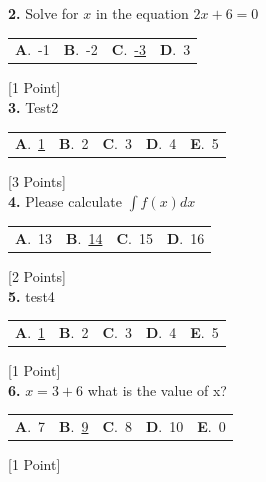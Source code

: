 \documentclass[12pt]{article}
\newcommand{\choice}[2]{\textbf{#1}.~#2}
\begin{document}
\noindent \textbf{\textenglish{2.}} {\textenglish{Solve for }}\(x \){\textenglish{ in the equation }}\(2x+6 = 0 \)

\begin{tabularx}{\linewidth}{@{}*{4}{Y}@{}}
\choice{A}{{{\textenglish{-1}}}} & \choice{B}{{{\textenglish{-2}}}} & \choice{C}{{\underline{{\textenglish{-3}}}}} & \choice{D}{{{\textenglish{3}}}} \\
\end{tabularx}
\hfill {\textenglish{[1 Point]}}\\[0.5em]

\noindent \textbf{\textenglish{3.}} {\textenglish{Test2}}

\begin{tabularx}{\linewidth}{@{}*{5}{Y}@{}}
\choice{A}{{\underline{{\textenglish{1}}}}} & \choice{B}{{{\textenglish{2}}}} & \choice{C}{{{\textenglish{3}}}} & \choice{D}{{{\textenglish{4}}}} & \choice{E}{{{\textenglish{5}}}} \\
\end{tabularx}
\hfill {\textenglish{[3 Points]}}\\[0.5em]

\noindent \textbf{\textenglish{4.}} {\textenglish{Please calculate }}\(\int f(x)dx\)

\begin{tabularx}{\linewidth}{@{}*{4}{Y}@{}}
\choice{A}{{{\textenglish{13}}}} & \choice{B}{{\underline{{\textenglish{14}}}}} & \choice{C}{{{\textenglish{15}}}} & \choice{D}{{{\textenglish{16}}}} \\
\end{tabularx}
\hfill {\textenglish{[2 Points]}}\\[0.5em]

\noindent \textbf{\textenglish{5.}} {\textenglish{test4}}

\begin{tabularx}{\linewidth}{@{}*{5}{Y}@{}}
\choice{A}{{\underline{{\textenglish{1}}}}} & \choice{B}{{{\textenglish{2}}}} & \choice{C}{{{\textenglish{3}}}} & \choice{D}{{{\textenglish{4}}}} & \choice{E}{{{\textenglish{5}}}} \\
\end{tabularx}
\hfill {\textenglish{[1 Point]}}\\[0.5em]

\noindent \textbf{\textenglish{6.}} \(x=3+6 \){\textenglish{ what is the value of x?}}

\begin{tabularx}{\linewidth}{@{}*{5}{Y}@{}}
\choice{A}{{{\textenglish{7}}}} & \choice{B}{{\underline{{\textenglish{9}}}}} & \choice{C}{{{\textenglish{8}}}} & \choice{D}{{{\textenglish{10}}}} & \choice{E}{{{\textenglish{0}}}} \\
\end{tabularx}
\hfill {\textenglish{[1 Point]}}\\[0.5em]
\end{document}
